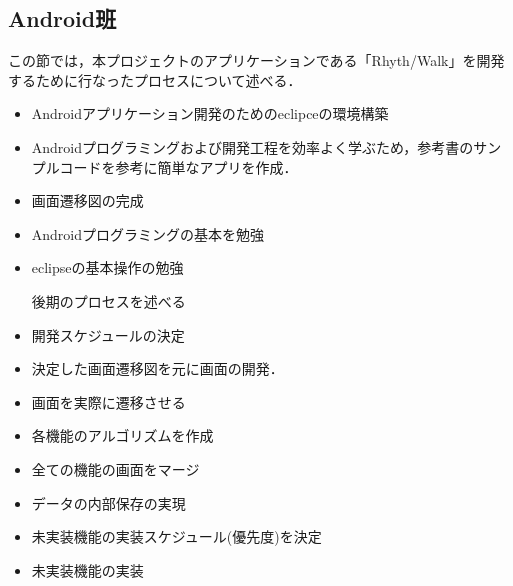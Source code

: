 \subsection{Android班}

\par この節では，本プロジェクトのアプリケーションである「Rhyth/Walk」を開発するために行なったプロセスについて述べる．
\begin{itemize}
\item Androidアプリケーション開発のためのeclipceの環境構築
\item Androidプログラミングおよび開発工程を効率よく学ぶため，参考書のサンプルコードを参考に簡単なアプリを作成．
\item 画面遷移図の完成
\item Androidプログラミングの基本を勉強
\item eclipseの基本操作の勉強

\par 後期のプロセスを述べる
\item 開発スケジュールの決定
\item 決定した画面遷移図を元に画面の開発．
\item 画面を実際に遷移させる
\item 各機能のアルゴリズムを作成
\item 全ての機能の画面をマージ
\item データの内部保存の実現
\item 未実装機能の実装スケジュール(優先度)を決定
\item 未実装機能の実装
 \end{itemize}
 
